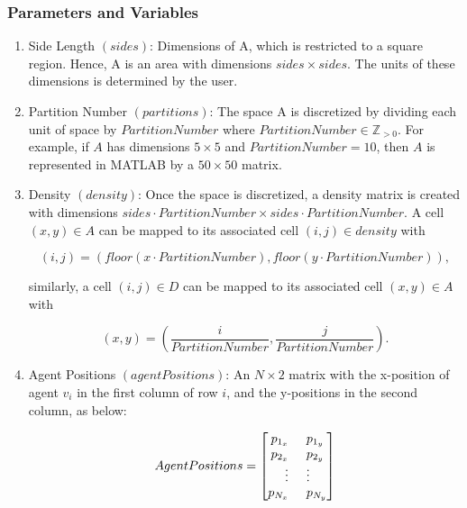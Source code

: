 \documentclass[../CourseManual.tex]{subfiles}
\begin{document}
\subsubsection{Parameters and Variables}

\renewcommand{\labelenumi}{\roman{enumi}}
\begin{enumerate}
  \item Side Length $(sides)$: Dimensions of A, which is restricted to a square region. Hence, A is an area with dimensions $sides \times sides$. The units of these dimensions is determined by the user.
  
  \item Partition Number $(partitions)$: The space A is discretized by dividing each unit of space by $Partition Number$ where $Partition Number \in \mathbb{Z}_{>0}$. For example, if $A$ has dimensions $5 \times 5$ and $Partition Number = 10$, then $A$ is represented in MATLAB by a $50 \times 50$ matrix.
  
  \item Density $(density)$: Once the space is discretized, a density matrix is created with dimensions $sides \cdot Partition Number \times sides \cdot Partition Number$. A cell $(x,y) \in A$ can be mapped to its associated cell $(i,j) \in density$ with
  
  $$(i,j) = (floor(x \cdot Partition Number), floor(y \cdot Partition Number)),$$
  
  similarly, a cell $(i,j) \in D$ can be mapped to its associated cell $(x,y) \in A$ with
  
  $$(x,y) = (\dfrac{i}{Partition Number},\dfrac{j}{Partition Number}).$$
  
  \item Agent Positions $(agentPositions)$: An $N \times 2$ matrix with the x-position of agent $v_i$ in the first column of row $i$, and the y-positions in the second column, as below:
  
  $$Agent Positions = 
  \begin{bmatrix}
    p_{1_{x}} \hspace{0.5cm} p_{1_{y}}\\
    p_{2_{x}} \hspace{0.5cm} p_{2_{y}}\\
    \vdots \hspace{0.5cm} \vdots \\
    p_{N_{x}} \hspace{0.5cm} p_{N_{y}}\\
  \end{bmatrix}$$
  

\end{enumerate}
\end{document}
